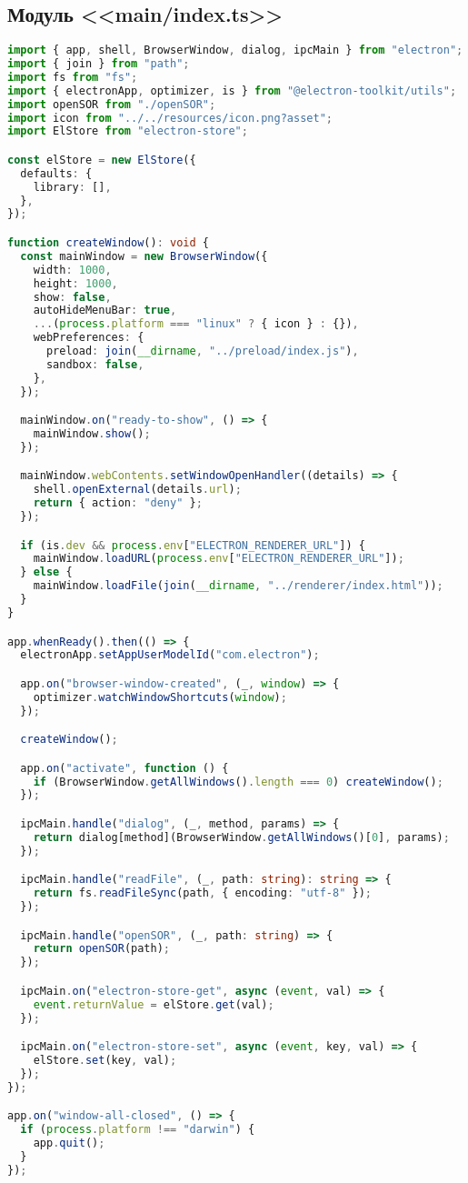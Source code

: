 \subsection{Модуль <<main/index.ts>>}
\begin{lstlisting}[language=typescript]
import { app, shell, BrowserWindow, dialog, ipcMain } from "electron";
import { join } from "path";
import fs from "fs";
import { electronApp, optimizer, is } from "@electron-toolkit/utils";
import openSOR from "./openSOR";
import icon from "../../resources/icon.png?asset";
import ElStore from "electron-store";

const elStore = new ElStore({
  defaults: {
    library: [],
  },
});

function createWindow(): void {
  const mainWindow = new BrowserWindow({
    width: 1000,
    height: 1000,
    show: false,
    autoHideMenuBar: true,
    ...(process.platform === "linux" ? { icon } : {}),
    webPreferences: {
      preload: join(__dirname, "../preload/index.js"),
      sandbox: false,
    },
  });

  mainWindow.on("ready-to-show", () => {
    mainWindow.show();
  });

  mainWindow.webContents.setWindowOpenHandler((details) => {
    shell.openExternal(details.url);
    return { action: "deny" };
  });

  if (is.dev && process.env["ELECTRON_RENDERER_URL"]) {
    mainWindow.loadURL(process.env["ELECTRON_RENDERER_URL"]);
  } else {
    mainWindow.loadFile(join(__dirname, "../renderer/index.html"));
  }
}

app.whenReady().then(() => {
  electronApp.setAppUserModelId("com.electron");

  app.on("browser-window-created", (_, window) => {
    optimizer.watchWindowShortcuts(window);
  });

  createWindow();

  app.on("activate", function () {
    if (BrowserWindow.getAllWindows().length === 0) createWindow();
  });

  ipcMain.handle("dialog", (_, method, params) => {
    return dialog[method](BrowserWindow.getAllWindows()[0], params);
  });

  ipcMain.handle("readFile", (_, path: string): string => {
    return fs.readFileSync(path, { encoding: "utf-8" });
  });

  ipcMain.handle("openSOR", (_, path: string) => {
    return openSOR(path);
  });

  ipcMain.on("electron-store-get", async (event, val) => {
    event.returnValue = elStore.get(val);
  });

  ipcMain.on("electron-store-set", async (event, key, val) => {
    elStore.set(key, val);
  });
});

app.on("window-all-closed", () => {
  if (process.platform !== "darwin") {
    app.quit();
  }
});
\end{lstlisting}
